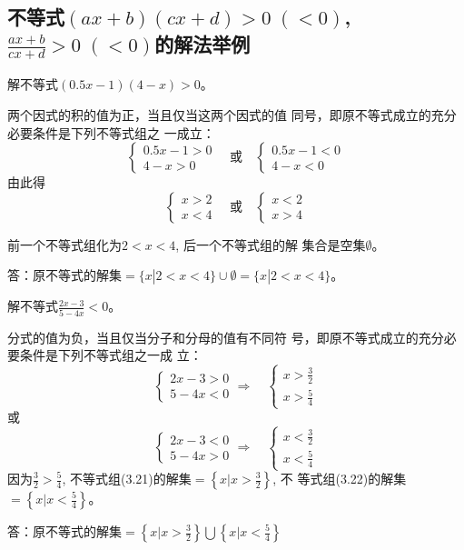 \subsection{不等式$(ax+b)(cx+d)>0\; (<0)$,
$\frac{ax+b}{cx+d}>0\; (<0)$的解法举例}
\begin{example}
    解不等式$(0.5x-1)(4-x)>0$。
\end{example}

\begin{solution}
两个因式的积的值为正，当且仅当这两个因式的值
同号，即原不等式成立的充分必要条件是下列不等式组之
一成立：
\[\begin{cases}
    0.5x-1>0\\4-x>0
\end{cases}\quad \text{或}\quad \begin{cases}
    0.5x-1<0\\4-x<0
\end{cases}\]
由此得
\[\begin{cases}
    x>2\\x<4
\end{cases}\quad \text{或}\quad \begin{cases}
    x<2\\x>4
\end{cases}\]

前一个不等式组化为$2<x<4$, 后一个不等式组的解
集合是空集$\emptyset$。

答：原不等式的解集$=\{x|2<x<4\}\cup\emptyset=\{x|2<x<4\}$。
\end{solution}

\begin{example}
    解不等式$\frac{2x-3}{5-4x}<0$。
\end{example}

\begin{solution}
分式的值为负，当且仅当分子和分母的值有不同符
号，即原不等式成立的充分必要条件是下列不等式组之一成
立：
\begin{equation}
    \begin{cases}
        2x-3>0\\5-4x<0
    \end{cases}\Rightarrow\quad \begin{cases}
        x>\frac{3}{2}\\  x>\frac{5}{4}
    \end{cases}
\end{equation}
或
\begin{equation}
    \begin{cases}
        2x-3<0\\5-4x>0
    \end{cases}\Rightarrow\quad \begin{cases}
        x<\frac{3}{2}\\  x<\frac{5}{4}
    \end{cases}
\end{equation}
因为$\frac{3}{2}>\frac{5}{4}$,
不等式组(3.21)的解集$=\left\{x\Big|x>\frac{3}{2}\right\}$, 不
等式组(3.22)的解集$=\left\{x\Big|x<\frac{5}{4}\right\}$。

答：原不等式的解集$=\left\{x\Big|x>\frac{3}{2}\right\}\bigcup\left\{x\Big|x<\frac{5}{4}\right\}$
\end{solution}

